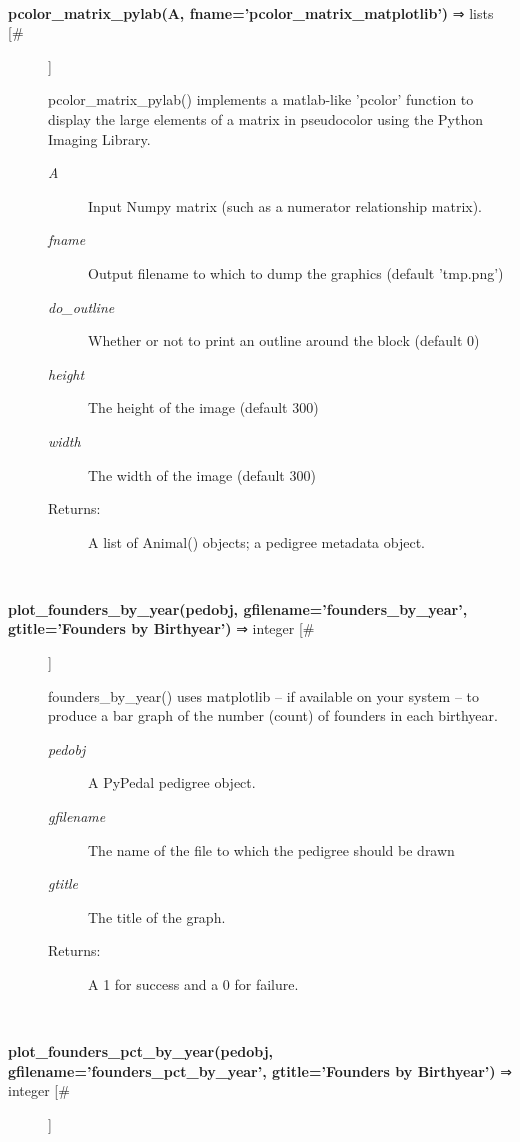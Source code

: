 \begin{description}
\begin{description}
\end{description}
\\ 

\item[\textbf{pcolor\_matrix\_pylab(A, fname='pcolor\_matrix\_matplotlib')}
 ⇒ lists [\#]]

 pcolor\_matrix\_pylab() implements a matlab-like 'pcolor' function to display the large elements of a matrix in pseudocolor using the Python Imaging Library.
\begin{description}
\item[\emph{A}
] Input Numpy matrix (such as a numerator relationship matrix).
\item[\emph{fname}
] Output filename to which to dump the graphics (default 'tmp.png')
\item[\emph{do\_outline}
] Whether or not to print an outline around the block (default 0)
\item[\emph{height}
] The height of the image (default 300)
\item[\emph{width}
] The width of the image (default 300)
\item[Returns:] A list of Animal() objects; a pedigree metadata object.

\end{description}
\\ 

\item[\textbf{plot\_founders\_by\_year(pedobj, gfilename='founders\_by\_year', gtitle='Founders by Birthyear')}
 ⇒ integer [\#]]

 founders\_by\_year() uses matplotlib -- if available on your system -- to produce a bar graph of the number (count) of founders in each birthyear.
\begin{description}
\item[\emph{pedobj}
] A PyPedal pedigree object.
\item[\emph{gfilename}
] The name of the file to which the pedigree should be drawn
\item[\emph{gtitle}
] The title of the graph.
\item[Returns:] A 1 for success and a 0 for failure.

\end{description}
\\ 

\item[\textbf{plot\_founders\_pct\_by\_year(pedobj, gfilename='founders\_pct\_by\_year', gtitle='Founders by Birthyear')}
 ⇒ integer [\#]]


\end{description}
